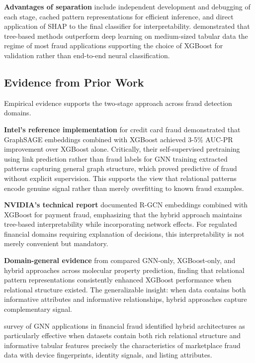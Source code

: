 \textbf{Advantages of separation} include independent development and debugging of each stage, cached pattern representations for efficient inference, and direct application of SHAP to the final classifier for interpretability. \citeauthor{grinsztajn2022why} \cite{grinsztajn2022why} demonstrated that tree-based methods outperform deep learning on medium-sized tabular data the regime of most fraud applications supporting the choice of XGBoost for validation rather than end-to-end neural classification.

\subsection{Evidence from Prior Work}

Empirical evidence supports the two-stage approach across fraud detection domains.

\textbf{Intel's reference implementation} \cite{intel2023credit} for credit card fraud demonstrated that GraphSAGE embeddings combined with XGBoost achieved 3-5\% AUC-PR improvement over XGBoost alone. Critically, their self-supervised pretraining using link prediction rather than fraud labels for GNN training extracted patterns capturing general graph structure, which proved predictive of fraud without explicit supervision. This supports the view that relational patterns encode genuine signal rather than merely overfitting to known fraud examples.

\textbf{NVIDIA's technical report} \cite{nvidia2023financial} documented R-GCN embeddings combined with XGBoost for payment fraud, emphasizing that the hybrid approach maintains tree-based interpretability while incorporating network effects. For regulated financial domains requiring explanation of decisions, this interpretability is not merely convenient but mandatory.

\textbf{Domain-general evidence} from \citeauthor{deng2021graph} \cite{deng2021graph} compared GNN-only, XGBoost-only, and hybrid approaches across molecular property prediction, finding that relational pattern representations consistently enhanced XGBoost performance when relational structure existed. The generalizable insight: when data contains both informative attributes and informative relationships, hybrid approaches capture complementary signal.

\citeauthor{motie2024financial} \cite{motie2024financial} survey of GNN applications in financial fraud identified hybrid architectures as particularly effective when datasets contain both rich relational structure and informative tabular features precisely the characteristics of marketplace fraud data with device fingerprints, identity signals, and listing attributes.


